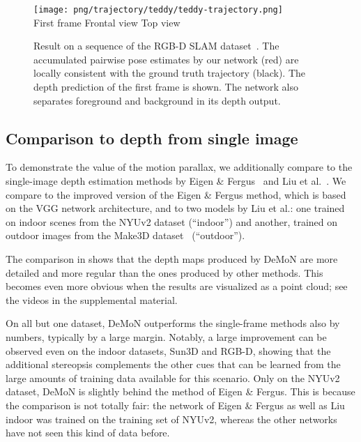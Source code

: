 \documentclass[10pt,twocolumn,letterpaper]{article}
\begin{document}
\begin{figure}
  \begin{center}
    \texttt{[image: png/trajectory/teddy/teddy-trajectory.png]}\\
    \vspace{-0.5em}
    \small First frame \hspace*{1.3cm} Frontal view \hspace*{1.1cm} Top view
  \end{center}
\vspace{\capvspace}%
\caption{%
Result on a sequence of the RGB-D SLAM dataset~\cite{sturm12iros}. 
The accumulated pairwise pose estimates by our network (red) are locally consistent with the ground truth trajectory (black).
The depth prediction of the first frame is shown. 
The network also separates foreground and background in its depth output.}
  \label{fig:trajectory_teddy}
\vspace{\figvspace}
\vspace{-0.3em}
\end{figure}



\subsection{Comparison to depth from single image}

To demonstrate the value of the motion parallax, we additionally compare to the single-image depth estimation methods by Eigen \& Fergus~\cite{eigen_predicting_2015} and Liu et al.~\cite{liu_learning_2015}.
We compare to the improved version of the Eigen \& Fergus method, which is based on the VGG network architecture, and to two models by Liu et al.: one trained on indoor scenes from the NYUv2 dataset (``indoor'') and another, trained on outdoor images from the Make3D dataset~\cite{Saxena05learningdepth} (``outdoor'').

The comparison in  shows that the depth maps produced by DeMoN are more detailed and more regular than the ones produced by other methods. This becomes even more obvious when the results are visualized as a point cloud; see the videos in the supplemental material. 

On all but one dataset, DeMoN outperforms the single-frame methods also by numbers, typically by a large margin. Notably, a large improvement can be observed even on the indoor datasets, Sun3D and RGB-D, showing that the additional stereopsis complements the other cues that can be learned from the large amounts of training data available for this scenario.
Only on the NYUv2 dataset, DeMoN is slightly behind the method of Eigen \& Fergus. 
This is because the comparison is not totally fair: the network of Eigen \& Fergus as well as Liu indoor was trained on the training set of NYUv2, whereas the other networks have not seen this kind of data before. 
\end{document}

